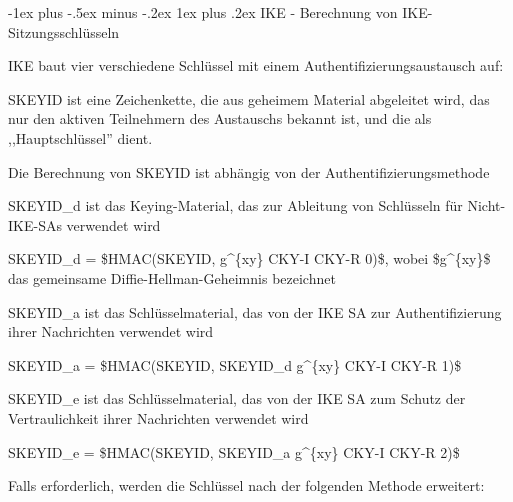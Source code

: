 \documentclass[a4paper]{article}
\makeatletter
\renewcommand{\subsubsection}{\@startsection{subsubsection}{3}{0mm}%
 {-1ex plus -.5ex minus -.2ex}%
 {1ex plus .2ex}%
 {\normalfont\small\bfseries}}
\makeatother
\begin{document}
\begin{multicols}{3}
\begin{itemize*}
            \subsubsection{IKE - Berechnung von
                  IKE-Sitzungsschlüsseln}

            \begin{itemize*}
                  \item
                  IKE baut vier verschiedene Schlüssel mit einem
                  Authentifizierungsaustausch auf:

                  \begin{itemize*}
                        \item SKEYID ist eine Zeichenkette, die aus geheimem Material abgeleitet wird, das nur den aktiven Teilnehmern des Austauschs bekannt ist, und die als ,,Hauptschlüssel'' dient.
                        \begin{itemize*} \item Die Berechnung von SKEYID ist abhängig von der Authentifizierungsmethode \end{itemize*}
                        \item SKEYID\_d ist das Keying-Material, das zur Ableitung von Schlüsseln für Nicht-IKE-SAs verwendet wird
                        \begin{itemize*} \item SKEYID\_d = \$HMAC(SKEYID, g\^{}\{xy\} \textbar{} CKY-I \textbar{} CKY-R \textbar{} 0)\$, wobei \$g\^{}\{xy\}\$ das gemeinsame Diffie-Hellman-Geheimnis bezeichnet \end{itemize*}
                        \item SKEYID\_a ist das Schlüsselmaterial, das von der IKE SA zur Authentifizierung ihrer Nachrichten verwendet wird
                        \begin{itemize*} \item SKEYID\_a = \$HMAC(SKEYID, SKEYID\_d \textbar{} g\^{}\{xy\} \textbar{} CKY-I \textbar{} CKY-R \textbar{} 1)\$ \end{itemize*}
                        \item SKEYID\_e ist das Schlüsselmaterial, das von der IKE SA zum Schutz der Vertraulichkeit ihrer Nachrichten verwendet wird
                        \begin{itemize*} \item SKEYID\_e = \$HMAC(SKEYID, SKEYID\_a \textbar{} g\^{}\{xy\} \textbar{} CKY-I \textbar{} CKY-R \textbar{} 2)\$ \end{itemize*}
                  \end{itemize*}
                  \item
                  Falls erforderlich, werden die Schlüssel nach der folgenden Methode
                  erweitert:


\end{itemize*}
\end{itemize*}
\end{multicols}
\end{document}
